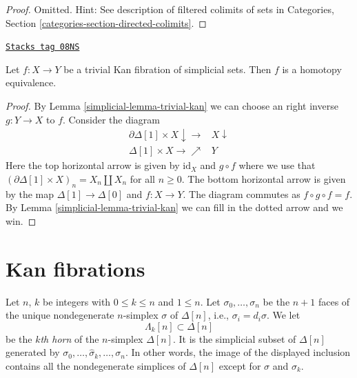 \begin{proof}
Omitted. Hint: See description of filtered colimits of sets in
Categories, Section \ref{categories-section-directed-colimits}.
\end{proof}

\begin{lemma}
\label{simplicial-lemma-trivial-kan-homotopy}
\href{https://stacks.math.columbia.edu/tag/08NS}{\texttt{Stacks tag 08NS}}

Let $f : X \to Y$ be a trivial Kan fibration of simplicial sets.
Then $f$ is a homotopy equivalence.
\end{lemma}

\begin{proof}

By Lemma \ref{simplicial-lemma-trivial-kan} we can choose an right inverse $g : Y \to X$
to $f$. Consider the diagram
$$
\begin{array}{cc}\partial \Delta[1] \times X \downarrow\longrightarrow & X \downarrow \\ \Delta[1] \times X \longrightarrow\nearrow & Y\end{array}
$$
Here the top horizontal arrow is given by $\text{id}_X$ and $g \circ f$
where we use that
$(\partial \Delta[1] \times X)_n = X_n \amalg X_n$ for all $n \geq 0$.
The bottom horizontal arrow is given by the map $\Delta[1] \to \Delta[0]$
and $f : X \to Y$. The diagram commutes as $f \circ g \circ f = f$.
By Lemma \ref{simplicial-lemma-trivial-kan} we can fill in the dotted arrow
and we win.
\end{proof}

\section{Kan fibrations}
\label{simplicial-section-kan}
Let $n$, $k$ be integers with $0 \leq k \leq n$ and $1 \leq n$.
Let $\sigma_0, \ldots, \sigma_n$
be the $n + 1$ faces of the unique nondegenerate $n$-simplex $\sigma$
of $\Delta[n]$, i.e., $\sigma_i = d_i\sigma$. We let
$$
\Lambda_k[n] \subset \Delta[n]
$$
be the {\it $k$th horn} of the $n$-simplex $\Delta[n]$. It is the
simplicial subset of $\Delta[n]$ generated by
$\sigma_0, \ldots, \hat \sigma_k, \ldots, \sigma_n$. In other words,
the image of the displayed inclusion contains all the nondegenerate
simplices of $\Delta[n]$ except for $\sigma$ and $\sigma_k$.

